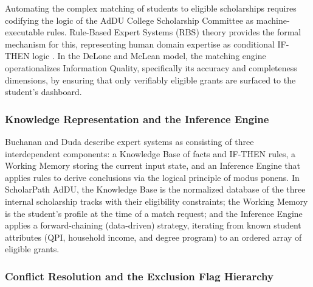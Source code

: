 Automating the complex matching of students to eligible scholarships requires codifying the logic of the AdDU College Scholarship Committee as machine-executable rules. Rule-Based Expert Systems (RBS) theory provides the formal mechanism for this, representing human domain expertise as conditional IF-THEN logic \cite{ref15}. In the DeLone and McLean \cite{ref20} model, the matching engine operationalizes Information Quality, specifically its accuracy and completeness dimensions, by ensuring that only verifiably eligible grants are surfaced to the student's dashboard.

\subsubsection{Knowledge Representation and the Inference Engine}

Buchanan and Duda \cite{ref15} describe expert systems as consisting of three interdependent components: a Knowledge Base of facts and IF-THEN rules, a Working Memory storing the current input state, and an Inference Engine that applies rules to derive conclusions via the logical principle of modus ponens. In ScholarPath AdDU, the Knowledge Base is the normalized database of the three internal scholarship tracks with their eligibility constraints; the Working Memory is the student's profile at the time of a match request; and the Inference Engine applies a forward-chaining (data-driven) strategy, iterating from known student attributes (QPI, household income, and degree program) to an ordered array of eligible grants.

\subsubsection{Conflict Resolution and the Exclusion Flag Hierarchy}


